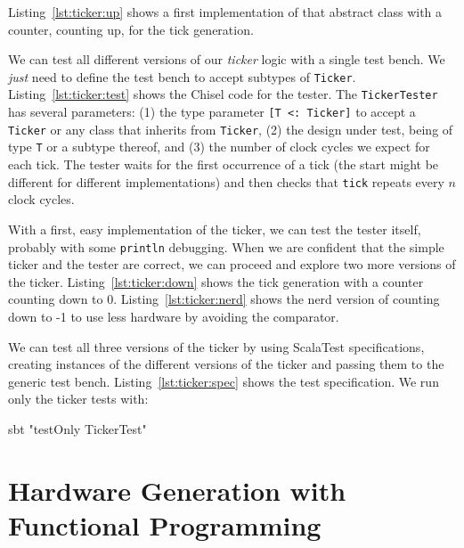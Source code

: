 \documentclass[%
    10pt,
    headinclude, footexclude,
    openright, %
    notitlepage,
    cleardoubleempty,
    headsepline,
    pointlessnumbers,
    bibtotoc, idxtotoc,
    ]{scrbook}
\newcommand{\code}[1]{{\lstinline[basicstyle=\small\ttfamily]{#1}}}
\begin{document}
\noindent Listing~\ref{lst:ticker:up} shows a first implementation of that abstract class
with a counter, counting up, for the tick generation.


We can test all different versions of our \emph{ticker} logic with a single test bench.
We \emph{just} need to define the test bench to accept subtypes of \code{Ticker}.
Listing~\ref{lst:ticker:test} shows the Chisel code for the tester.
The \code{TickerTester} has several parameters: (1) the type parameter
\code{[T <: Ticker]} to accept a \code{Ticker} or any class that inherits from \code{Ticker},
(2) the design under test, being of type \code{T} or a subtype thereof,
and (3) the number of clock cycles we expect for each tick.
The tester waits for the first occurrence of a tick (the start might be different for
different implementations) and then checks that \code{tick} repeats every $n$ clock cycles.


With a first, easy implementation of the ticker, we can test the tester
itself, probably with some \code{println} debugging. When we are confident that
the simple ticker and the tester are correct, we can proceed and explore
two more versions of the ticker. Listing~\ref{lst:ticker:down} shows the tick
generation with a counter counting down to 0.
Listing~\ref{lst:ticker:nerd} shows the nerd version of counting down to -1 to use
less hardware by avoiding the comparator.



We can test all three versions of the ticker by using ScalaTest specifications,
creating instances of the different versions of the ticker and passing them
to the generic test bench. Listing~\ref{lst:ticker:spec} shows the test specification.
We run only the ticker tests with:
\begin{chisel}
sbt "testOnly TickerTest"
\end{chisel}


\section{Hardware Generation with Functional Programming}
\label{sec:functional}
\end{document}
